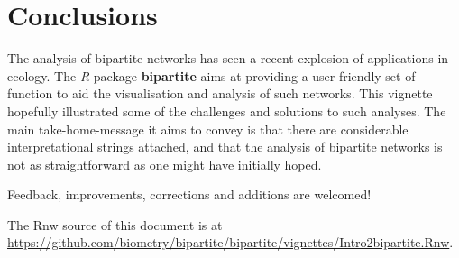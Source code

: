 \documentclass[a4paper, 11pt]{article}\usepackage[]{graphicx}\usepackage[]{color}
\newcommand{\package}[1]{\textbf{#1}}
\newcommand{\proglang}[1]{\textsl{#1}}
\begin{document}
\section*{Conclusions}%
The analysis of bipartite networks has seen a recent explosion of applications in ecology. The \proglang{R}-package \package{bipartite} aims at providing a user-friendly set of function to aid the visualisation and analysis of such networks. This vignette hopefully illustrated some of the  challenges and solutions to such analyses. The main take-home-message it aims to convey is that there are considerable interpretational strings attached, and that the analysis of bipartite networks is not as straightforward as one might have initially hoped.

\medskip
\noindent Feedback, improvements, corrections and additions are welcomed!







\bigskip

The Rnw source of this document is at \url{https://github.com/biometry/bipartite/bipartite/vignettes/Intro2bipartite.Rnw}.

\setlength{\bibsep}{0cm}
\def\bibfont{\small}



\printindex
\end{document}
